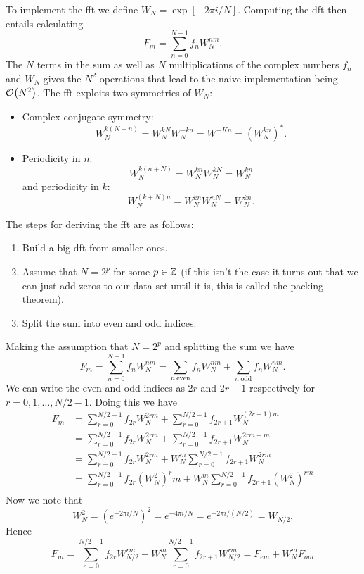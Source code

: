 \documentclass[a4paper]{article}
\begin{document}
    To implement the \gls{fft} we define \(W_N = \exp[-2\pi i/N]\).
    Computing the \gls{dft} then entails calculating
    \[F_m = \sum_{n=0}^{N-1}f_nW_N^{nm}.\]
    The \(N\) terms in the sum as well as \(N\) multiplications of the complex numbers \(f_n\) and \(W_N\) gives the \(N^2\) operations that lead to the naive implementation being \(\order{N^2}\).
    The \gls{fft} exploits two symmetries of \(W_N\):
    \begin{itemize}
        \item Complex conjugate symmetry:
        \[W_N^{k(N-n)} = W_N^{kN}W_N^{-kn} = W^{-Kn} = (W_N^{kn})^*.\]
        \item Periodicity in \(n\):
        \[W_N^{k(n + N)} = W_N^{kn}W_N^{kN} = W_N^{kn}\]
        and periodicity in \(k\):
        \[W_N^{(k + N)n} = W_N^{kn}W_N^{nN} = W_N^{kn}.\]
    \end{itemize}
    The steps for deriving the \gls{fft} are as follows:
    \begin{enumerate}
        \item Build a big \gls{dft} from smaller ones.
        \item Assume that \(N = 2^p\) for some \(p\in\mathbb{Z}\) (if this isn't the case it turns out that we can just add zeros to our data set until it is, this is called the packing theorem).
        \item Split the sum into even and odd indices.
    \end{enumerate}
    Making the assumption that \(N = 2^p\) and splitting the sum we have
    \[F_m = \sum_{n=0}^{N-1}f_nW_N^{nm} = \sum_{n~\text{even}}f_nW_N^{nm} + \sum_{n~\text{odd}}f_nW_N^{nm}.\]
    We can write the even and odd indices as \(2r\) and \(2r+1\) respectively for \(r = 0, 1, \dots, N/2 - 1\).
    Doing this we have
    \begin{align*}
        F_m &= \sum_{r=0}^{N/2-1}f_{2r}W_N^{2rm} + \sum_{r=0}^{N/2-1}f_{2r+1}W_N^{(2r+1)m}\\
        &= \sum_{r=0}^{N/2-1}f_{2r}W_N^{2rm} + \sum_{r=0}^{N/2-1}f_{2r+1}W_N^{2rm+m}\\
        &= \sum_{r=0}^{N/2-1}f_{2r}W_N^{2rm} + W_{N}^m\sum_{r=0}^{N/2-1}f_{2r+1}W_N^{2rm}\\
        &= \sum_{r=0}^{N/2-1}f_{2r}(W_N^2)^rm + W_N^m\sum_{r=0}^{N/2-1}f_{2r+1}(W_N^2)^{rm}\\
    \end{align*}
    Now we note that
    \[W_N^2 = (e^{-2\pi i/N})^2 = e^{-4\pi i/N} = e^{-2\pi i/(N/2)} = W_{N/2}.\]
    Hence
    \[F_m = \sum_{r=0}^{N/2 - 1} f_{2r}W_{N/2}^{rm} + W_N^m\sum_{r=0}^{N/2-1} f_{2r+1}W_{N/2}^{rm} = F_{em} + W_N^mF_{om}\]
\end{document}
